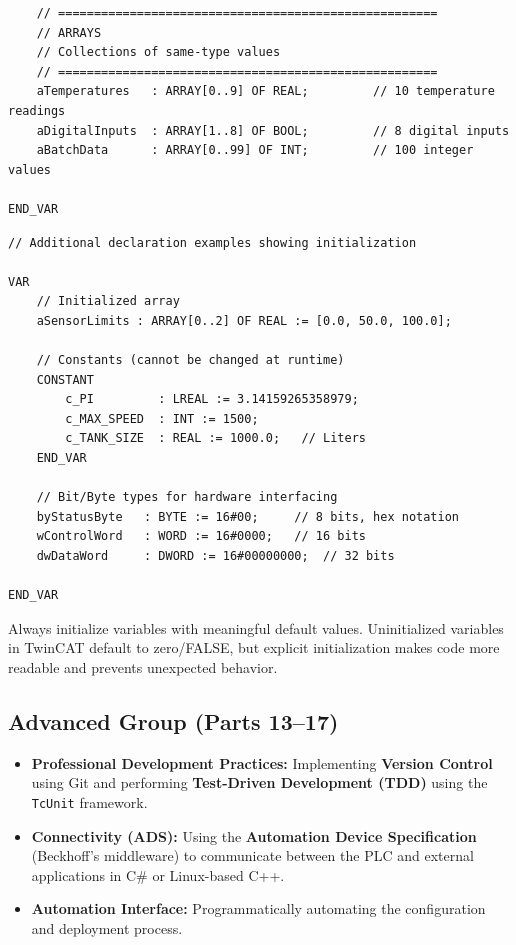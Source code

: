 \documentclass[11pt,a4paper]{article}
\begin{document}
\begin{lstlisting}
    // =====================================================
    // ARRAYS
    // Collections of same-type values
    // =====================================================
    aTemperatures   : ARRAY[0..9] OF REAL;         // 10 temperature readings
    aDigitalInputs  : ARRAY[1..8] OF BOOL;         // 8 digital inputs
    aBatchData      : ARRAY[0..99] OF INT;         // 100 integer values
    
END_VAR
\end{lstlisting}

\begin{lstlisting}
// Additional declaration examples showing initialization

VAR
    // Initialized array
    aSensorLimits : ARRAY[0..2] OF REAL := [0.0, 50.0, 100.0];
    
    // Constants (cannot be changed at runtime)
    CONSTANT
        c_PI         : LREAL := 3.14159265358979;
        c_MAX_SPEED  : INT := 1500;
        c_TANK_SIZE  : REAL := 1000.0;   // Liters
    END_VAR
    
    // Bit/Byte types for hardware interfacing
    byStatusByte   : BYTE := 16#00;     // 8 bits, hex notation
    wControlWord   : WORD := 16#0000;   // 16 bits
    dwDataWord     : DWORD := 16#00000000;  // 32 bits
    
END_VAR
\end{lstlisting}

\begin{tipbox}
Always initialize variables with meaningful default values. Uninitialized variables in TwinCAT default to zero/FALSE, but explicit initialization makes code more readable and prevents unexpected behavior.
\end{tipbox}

\subsection{Advanced Group (Parts 13--17)}

\begin{itemize}[leftmargin=*]
    \item \textbf{Professional Development Practices:} Implementing \textbf{Version Control} using Git and performing \textbf{Test-Driven Development (TDD)} using the \texttt{TcUnit} framework.
    
    \item \textbf{Connectivity (ADS):} Using the \textbf{Automation Device Specification} (Beckhoff's middleware) to communicate between the PLC and external applications in C\# or Linux-based C++.
    
    \item \textbf{Automation Interface:} Programmatically automating the configuration and deployment process.
\end{itemize}
\end{document}
